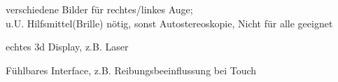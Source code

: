  verschiedene Bilder für rechtes/linkes Auge;\\
 u.U. Hilfsmittel(Brille) nötig, sonst Autostereoskopie, Nicht für alle geeignet

 echtes 3d Display, z.B. Laser

 Fühlbares Interface, z.B. Reibungsbeeinflussung bei Touch

